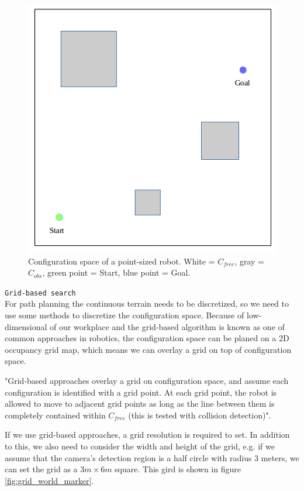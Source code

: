\begin{figure}[h]
\centering
\includegraphics[scale=0.5]{./fig/confi_space.png}
\caption{Configuration space of a point-sized robot. White = $C_{free}$, gray = $C_{obs}$, green point = Start, blue point = Goal\cite{wiki_motion_planning}.}
\label{fig:confi_space}
\end{figure}

\texttt{Grid-based search}\\
For path planning the continuous terrain needs to be discretized, so we need to use some methods to discretize the configuration space. Because of low-dimensional of our workplace and the grid-based algorithm is known as one of common approaches in robotics, the configuration space can be planed on a 2D occupancy grid map, which means we can overlay a grid on top of configuration space.

"Grid-based approaches overlay a grid on configuration space, and assume each configuration is identified with a grid point. At each grid point, the robot is allowed to move to adjacent grid points as long as the line between them is completely contained within $C_{free}$ (this is tested with collision detection)"\cite{wiki_motion_planning}.

If we use grid-based approaches, a grid resolution is required to set. In addition to this, we also need to consider the width and height of the grid, e.g. if we assume that the camera's detection region is a half circle with radius 3 meters, we can set the grid as a $3m \times 6m$ square. This gird is shown in figure \ref{fig:grid_world_marker}. 

